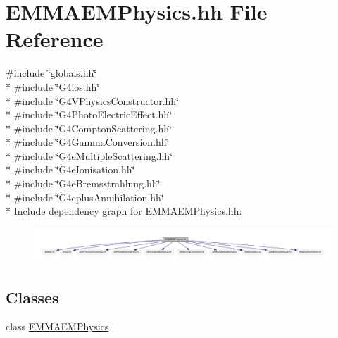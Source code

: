 \hypertarget{EMMAEMPhysics_8hh}{}\section{E\+M\+M\+A\+E\+M\+Physics.\+hh File Reference}
\label{EMMAEMPhysics_8hh}
{\ttfamily \#include \char`\"{}globals.\+hh\char`\"{}}\\*
{\ttfamily \#include \char`\"{}G4ios.\+hh\char`\"{}}\\*
{\ttfamily \#include \char`\"{}G4\+V\+Physics\+Constructor.\+hh\char`\"{}}\\*
{\ttfamily \#include \char`\"{}G4\+Photo\+Electric\+Effect.\+hh\char`\"{}}\\*
{\ttfamily \#include \char`\"{}G4\+Compton\+Scattering.\+hh\char`\"{}}\\*
{\ttfamily \#include \char`\"{}G4\+Gamma\+Conversion.\+hh\char`\"{}}\\*
{\ttfamily \#include \char`\"{}G4e\+Multiple\+Scattering.\+hh\char`\"{}}\\*
{\ttfamily \#include \char`\"{}G4e\+Ionisation.\+hh\char`\"{}}\\*
{\ttfamily \#include \char`\"{}G4e\+Bremsstrahlung.\+hh\char`\"{}}\\*
{\ttfamily \#include \char`\"{}G4eplus\+Annihilation.\+hh\char`\"{}}\\*
Include dependency graph for E\+M\+M\+A\+E\+M\+Physics.\+hh\+:
\nopagebreak
\begin{figure}[H]
\begin{center}
\leavevmode
\includegraphics[width=350pt]{EMMAEMPhysics_8hh__incl}
\end{center}
\end{figure}
\subsection*{Classes}
\begin{DoxyCompactItemize}
\item 
class \hyperlink{classEMMAEMPhysics}{E\+M\+M\+A\+E\+M\+Physics}
\end{DoxyCompactItemize}
